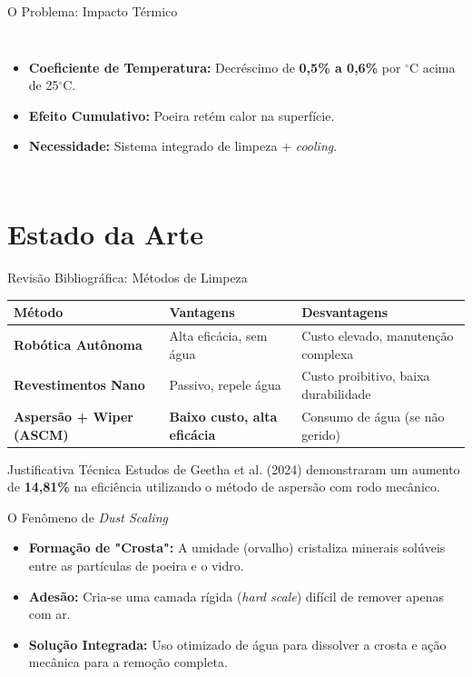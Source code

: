 \documentclass[aspectratio=169, xcolor={table}]{beamer}
\begin{document}
\begin{frame}{O Problema: Impacto Térmico}
    \begin{columns}
        \begin{itemize}
            \item \textbf{Coeficiente de Temperatura:} Decréscimo de \textbf{0,5\% a 0,6\%} por $^\circ$C acima de 25$^\circ$C.
            \item \textbf{Efeito Cumulativo:} Poeira retém calor na superfície.
            \item \textbf{Necessidade:} Sistema integrado de limpeza + \textit{cooling}.
        \end{itemize}
    \end{columns}
\end{frame}

\section{Estado da Arte}

\begin{frame}{Revisão Bibliográfica: Métodos de Limpeza}
    \begin{table}[]
        \centering
        \footnotesize
        \begin{tabular}{@{}lll@{}}
        \toprule
        \textbf{Método} & \textbf{Vantagens} & \textbf{Desvantagens} \\ \midrule
        \textbf{Robótica Autônoma} & Alta eficácia, sem água & Custo elevado, manutenção complexa \\
        \textbf{Revestimentos Nano} & Passivo, repele água & Custo proibitivo, baixa durabilidade \\
        \textbf{Aspersão + Wiper (ASCM)} & \textbf{Baixo custo, alta eficácia} & Consumo de água (se não gerido) \\ \bottomrule
        \end{tabular}
    \end{table}
    \begin{block}{Justificativa Técnica}
        Estudos de Geetha et al. (2024) demonstraram um aumento de \textbf{14,81\%} na eficiência utilizando o método de aspersão com rodo mecânico.
    \end{block}
\end{frame}

\begin{frame}{O Fenômeno de \textit{Dust Scaling}}
    \begin{itemize}
        \item \textbf{Formação de "Crosta":} A umidade (orvalho) cristaliza minerais solúveis entre as partículas de poeira e o vidro.
        \item \textbf{Adesão:} Cria-se uma camada rígida (\textit{hard scale}) difícil de remover apenas com ar.
        \item \textbf{Solução Integrada:} Uso otimizado de água para dissolver a crosta e ação mecânica para a remoção completa.
    \end{itemize}
\end{frame}
\end{document}
